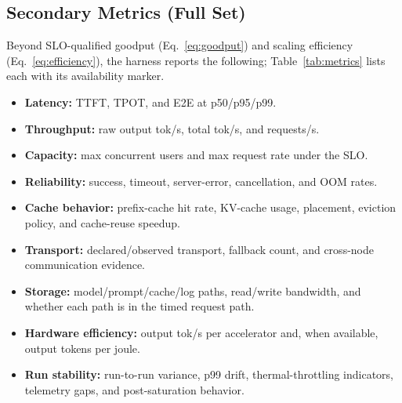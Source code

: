 \subsection{Secondary Metrics (Full Set)}
\label{subsec:secondary_full}
Beyond SLO-qualified goodput (Eq.~\ref{eq:goodput}) and scaling efficiency
(Eq.~\ref{eq:efficiency}), the harness reports the following; Table~\ref{tab:metrics}
lists each with its availability marker.
\begin{itemize}[leftmargin=*, nosep, topsep=0pt, partopsep=0pt]
    \setlength{\itemsep}{0pt}\setlength{\parskip}{0pt}\setlength{\parsep}{0pt}\setlength{\topsep}{0pt}
    \item \textbf{Latency:} TTFT, TPOT, and E2E at p50/p95/p99.
    \item \textbf{Throughput:} raw output tok/s, total tok/s, and requests/s.
    \item \textbf{Capacity:} max concurrent users and max request rate under the SLO.
    \item \textbf{Reliability:} success, timeout, server-error, cancellation, and OOM rates.
    \item \textbf{Cache behavior:} prefix-cache hit rate, KV-cache usage, placement, eviction policy, and cache-reuse speedup.
    \item \textbf{Transport:} declared/observed transport, fallback count, and cross-node communication evidence.
    \item \textbf{Storage:} model/prompt/cache/log paths, read/write bandwidth, and whether each path is in the timed request path.
    \item \textbf{Hardware efficiency:} output tok/s per accelerator and, when available, output tokens per joule.
    \item \textbf{Run stability:} run-to-run variance, p99 drift, thermal-throttling indicators, telemetry gaps, and post-saturation behavior.
\end{itemize}

